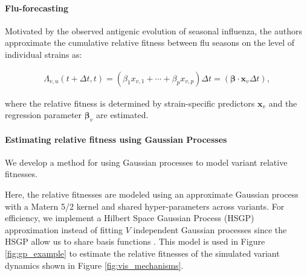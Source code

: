 \documentclass[12pt,oneside,letterpaper]{article}
\renewcommand{\vec}[1]{\boldsymbol{#1}}
\begin{document}
\paragraph{Flu-forecasting}%

Motivated by the observed antigenic evolution of seasonal influenza, the authors approximate the cumulative relative fitness between flu seasons on the level of individual strains as:

\begin{align*}
    \Lambda_{v,u}(t + \Delta t,t) = (\beta_{1} x_{v,1} + \cdots + \beta_{p} x_{v, p})\Delta t = (\vec{\beta} \cdot \vec{x}_{v} \Delta t),
\end{align*}

where the relative fitness is determined by strain-specific predictors $\vec{x}_{v}$ and the regression parameter $\vec{\beta}_{v}$ are estimated.

\paragraph{Estimating relative fitness using Gaussian Processes}%

We develop a method for using Gaussian processes to model variant relative fitnesses.


Here, the relative fitnesses are modeled using an approximate Gaussian process with a Matern 5/2 kernel and shared hyper-parameters across variants.
For efficiency, we implement a Hilbert Space Gaussian Process (HSGP) approximation instead of fitting $V$ independent Gaussian processes since the HSGP allow us to share basis functions \cite{riutortmayol2022practical}.
This model is used in Figure \ref{fig:gp_example} to estimate the relative fitnesses of the simulated variant dynamics shown in Figure \ref{fig:vis_mechanisms}.
\end{document}
